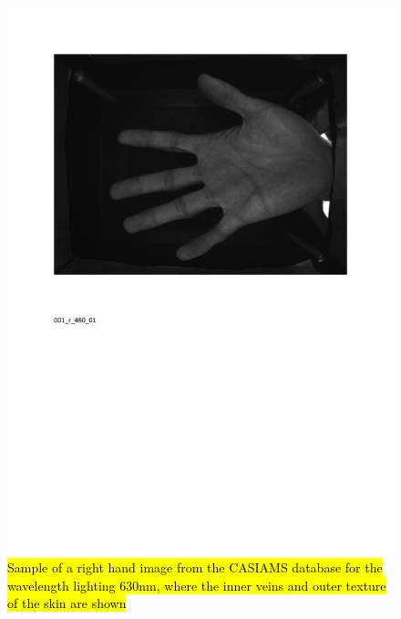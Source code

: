 \documentclass[review]{elsarticle}
\begin{document}
		\begin{figure}[!h]
		    \centering
		    \includegraphics[page=2,scale=.57,trim=1cm 14.7cm 1cm 1.7cm,clip]{CASIA_multi_spectral_samples.pdf}
		    \caption{\hl{Sample of a right hand image from the CASIAMS database for the wavelength lighting 630nm, where the inner veins and outer texture of the skin are shown}}
		    \label{fig:IIT_problematic_rings2}
		\end{figure}
\end{document}
